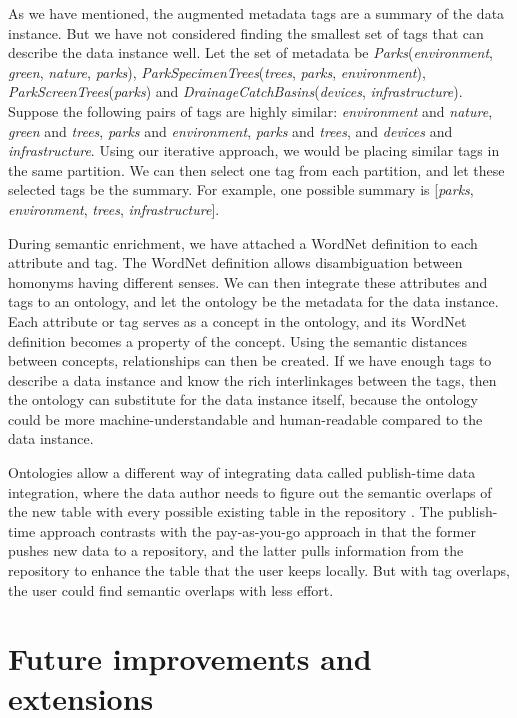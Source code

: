 As we have mentioned, the augmented metadata tags are a summary of the data instance. But we have not considered finding the smallest set of tags that can describe the data instance well. Let the set of metadata be \textit{Parks}(\textit{environment}, \textit{green}, \textit{nature}, \textit{parks}), \textit{ParkSpecimenTrees}(\textit{trees}, \textit{parks}, \textit{environment}), \textit{ParkScreenTrees}(\textit{parks}) and \textit{DrainageCatchBasins}(\textit{devices}, \textit{infrastructure}). Suppose the following pairs of tags are highly similar: \textit{environment} and \textit{nature}, \textit{green} and \textit{trees}, \textit{parks} and \textit{environment}, \textit{parks} and \textit{trees}, and \textit{devices} and \textit{infrastructure}. Using our iterative approach, we would be placing similar tags in the same partition. We can then select one tag from each partition, and let these selected tags be the summary. For example, one possible summary is [\textit{parks}, \textit{environment}, \textit{trees},  \textit{infrastructure}].

During semantic enrichment, we have attached a WordNet definition to each attribute and tag. The WordNet definition allows disambiguation between homonyms having different senses. We can then integrate these attributes and tags to an ontology, and let the ontology be the metadata for the data instance. Each attribute or tag serves as a concept in the ontology, and its WordNet definition becomes a property of the concept. Using the semantic distances between concepts, relationships can then be created. If we have enough tags to describe a data instance and know the rich interlinkages between the tags, then the ontology can substitute for the data instance itself, because the ontology could be more machine-understandable and human-readable compared to the data instance.

Ontologies allow a different way of integrating data called publish-time data integration, where the data author needs to figure out the semantic overlaps of the new table with every possible existing table in the repository \cite{Diego2018Machine}. The publish-time approach contrasts with the pay-as-you-go approach in that the former pushes new data to a repository, and the latter pulls information from the repository to enhance the table that the user keeps locally. But with tag overlaps, the user could find semantic overlaps with less effort.

\section{Future improvements and extensions}
\label{sec:FutureImprovementsAndExtensions}

